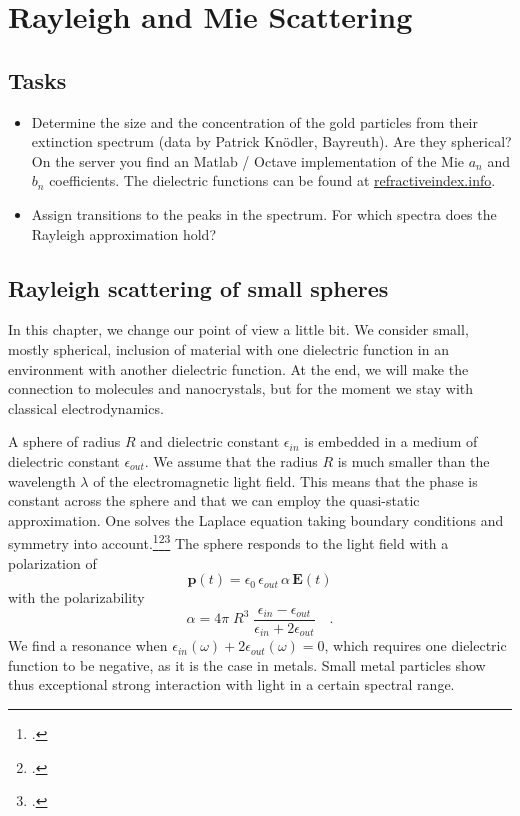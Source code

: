

\chapter{Rayleigh and Mie Scattering}





\section{Tasks}

\begin{itemize}
\item Determine the size and the concentration of the gold particles from their extinction spectrum (data by Patrick Knödler, Bayreuth). Are they spherical? On the server you find an Matlab / Octave implementation of the Mie $a_n$ and $b_n$ coefficients. The dielectric functions can be found at \href{https://refractiveindex.info/}{refractiveindex.info}.

\item Assign transitions to the peaks in the spectrum. For which spectra does the Rayleigh approximation hold?


\end{itemize}


\section{Rayleigh scattering of small spheres}


In this chapter, we change our point of view a little bit. We consider small, mostly spherical, inclusion of material with one dielectric function in an environment with another dielectric function. At the end, we will make the connection to molecules and nanocrystals, but for the moment we stay with classical electrodynamics.


A sphere of radius $R$ and dielectric constant $\epsilon_{in}$ is embedded in a medium of dielectric constant $\epsilon_{out}$. We assume that the radius $R$ is much smaller than the wavelength $\lambda$ of the electromagnetic light field. This means that the phase is constant across the sphere and that we can employ the quasi-static approximation. One solves the Laplace equation taking  boundary conditions and symmetry into account.\footcite{Jackson-ED}\footcite[excercise 2.4.2]{Nolting-ED}\footcite[chapter 5.2]{BH-book}
The sphere responds to the light field with a polarization of
\begin{equation}
 \mathbf{p}(t) = \epsilon_0 \,  \epsilon_{out} \, \alpha \, \mathbf{E}(t)
\end{equation}
with the polarizability
\begin{equation}
 \alpha = 4 \pi  \; R^3 \; \frac{\epsilon_{in} - \epsilon_{out}}{\epsilon_{in} + 2 \epsilon_{out}} \quad .
\end{equation}
We find a resonance when $\epsilon_{in}(\omega) + 2 \epsilon_{out}(\omega) = 0$, which requires one dielectric function to be negative, as it is the case in metals. Small metal particles show thus exceptional strong interaction with light in a certain spectral range.





